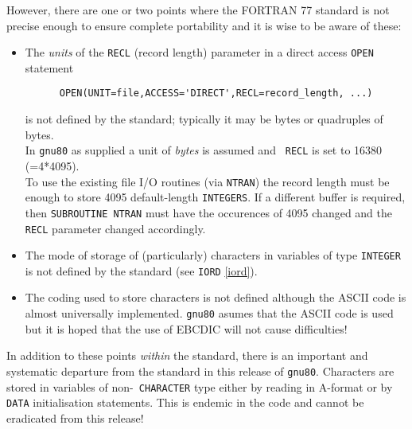 \documentclass{article}
\begin{document}
However, there are one or two points where the FORTRAN 77 standard is
not precise enough to ensure complete portability and it is wise to be
aware of these:
\begin{itemize}
\item The {\em units} of the {\tt RECL} (record length) parameter in a
  direct access {\tt OPEN} statement
\begin{verbatim}
      OPEN(UNIT=file,ACCESS='DIRECT',RECL=record_length, ...)
\end{verbatim}
  is not defined by the standard;
  typically it may be bytes or quadruples of bytes. \\
  In {\tt gnu80} as supplied a unit of {\em bytes} is assumed and {\tt
    RECL}
  is set to 16380 (=4*4095). \\
  To use the existing file I/O routines (via {\tt NTRAN}) the record
  length must be enough to store 4095 default-length {\tt INTEGERS}.
  If a different buffer is required, then {\tt SUBROUTINE NTRAN} must
  have the occurences of 4095 changed and the {\tt RECL} parameter
  changed accordingly.
\item The mode of storage of (particularly) characters in variables of
  type {\tt INTEGER} is not defined by the standard (see {\tt IORD}
  \ref{iord}).
\item The coding used to store characters is not defined although the
  ASCII code is almost universally implemented. {\tt gnu80} asumes
  that the ASCII code is used but it is hoped that the use of EBCDIC
  will not cause difficulties!
\end{itemize}
In addition to these points {\em within} the standard, there is an
important and systematic departure from the standard in this release
of {\tt gnu80}. Characters are stored in variables of non-{\tt
  CHARACTER} type either by reading in A-format or by {\tt DATA}
initialisation statements. This is endemic in the code and cannot be
eradicated from this release!
\begin{center}
\end{center}
\end{document}
